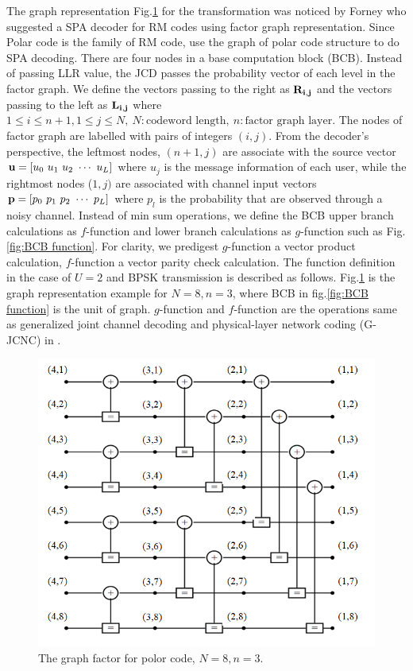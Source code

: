 	The graph representation Fig.\ref{fig:graph_presentaion} for the transformation was noticed by Forney who suggested a SPA decoder for RM codes using factor graph representation. Since Polar code is the family of RM code, \cite{arikan2010polar} use the graph of polar code structure to do SPA decoding. There are four nodes in a base computation block (BCB). Instead of passing LLR value, the JCD passes the probability vector of each level in the factor graph. We define the vectors passing to the right as $\bf{R_{i,j}}$ and the vectors passing to the left as $\bf{L_{i,j}}$ where $1 \leq i \leq n+1, 1 \leq j \leq N, \ N:\text{codeword length}, \ n:\text{factor graph layer}$. The nodes of factor graph are labelled with pairs of integers $(i,j)$. From the decoder's perspective, the leftmost nodes, $(n+1,j)$ are associate with the source vector ${\bf u}=[u_0  \ u_1 \ u_2 \ \cdots  \ u_L]$ where $u_{j}$ is the message information of each user, while the rightmost nodes ($1,j)$ are associated with channel input vectors ${\bf p}=[p_0  \ p_1 \ p_2 \ \cdots  \ p_L]$ where $p_l$ is the probability that are observed through a noisy channel. Instead of min sum operations, we define the BCB upper branch calculations as $f$-function and lower branch calculations as $g$-function such as Fig.\ref{fig:BCB function}. For clarity, we predigest $g$-function a vector product calculation, $f$-function a vector parity check calculation. The function definition in the case of $U=2$ and BPSK transmission is described as follows. Fig.\ref{fig:graph_presentaion} is the graph representation example for $N=8, n=3$, where BCB in fig.\ref{fig:BCB function} is the unit of graph. $g$-function and $f$-function are the operations same as generalized joint channel decoding and physical-layer network coding (G-JCNC) in \cite{gjcnc10}. 
	

\begin{figure}[t!]
 \centering
 \includegraphics[width=12cm]{fig/graph_presentation.png}
 \caption{The graph factor for polor code, $N=8, n=3$.}
 \label{fig:graph_presentaion}
\end{figure}

